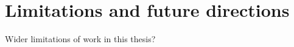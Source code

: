 




\section{Limitations and future directions}
\label{sec:17-limitations}

Wider limitations of work in this thesis?

